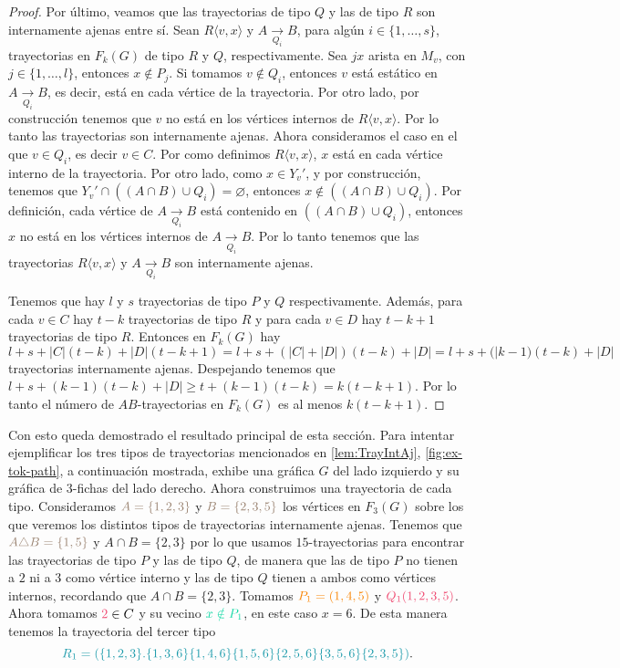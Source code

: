 \begin{proof}
    Por \'ultimo, veamos que las trayectorias de tipo $Q$ y las de tipo $R$ son
    internamente ajenas entre s\'i. Sean $R\langle v,x \rangle$ y $A
    \xrightarrow[Q_i]{}  B$, para alg\'un $i \in \{1, \dots, s\}$, trayectorias
    en $F_k(G)$ de tipo $R$ y $Q$, respectivamente. Sea $jx$ arista en $M_v$,
    con $j \in \{1, \dots, l\}$, entonces $x \notin P_j$. Si tomamos $v \notin
    Q_i$, entonces $v$ est\'a est\'atico en $A \xrightarrow[Q_i]{} B$, es decir,
    est\'a en cada v\'ertice de la trayectoria. Por otro lado, por
    construcci\'on tenemos que $v$ no est\'a en los v\'ertices internos de $R
    \langle v, x \rangle$. Por lo tanto las trayectorias son internamente
    ajenas. Ahora consideramos el caso en el que $v \in Q_i$, es decir $v \in
    C$. Por como definimos $R \langle v,x \rangle$, $x$ est\'a en cada
    v\'ertice interno de la trayectoria. Por otro lado, como $x \in Y_v'$, y por
    construcci\'on, tenemos que $Y_v ' \cap ((A\cap B) \cup Q_i) = \varnothing$,
    entonces $x \notin ((A \cap B) \cup Q_i)$. Por definici\'on, cada v\'ertice
    de $A \xrightarrow[Q_i]{}  B$ est\'a contenido en $((A \cap B) \cup Q_i)$,
    entonces $x$ no est\'a en los v\'ertices internos de $A \xrightarrow[Q_i]{}
    B$. Por lo tanto tenemos que las trayectorias $R \langle v,x \rangle$ y $A
    \xrightarrow[Q_i]{}  B$ son internamente ajenas.

    Tenemos que hay $l$ y $s$ trayectorias de tipo $P$ y $Q$ respectivamente.
    Adem\'as, para cada $v \in C$ hay $t-k$ trayectorias de tipo $R$ y para cada
    $v \in D$ hay $t-k+1$ trayectorias de tipo $R$. Entonces en $F_k(G)$ hay $l+
    s+ |C|(t-k)+ |D|(t-k +1) = l + s + (|C| + |D|)(t-k) + |D| = l + s +
    (|k-1)(t-k) + |D|$ trayectorias internamente ajenas. Despejando tenemos que
    $l + s + (k-1)(t-k) + |D| \geq t+ (k-1)(t-k) = k (t -k +1)$. Por lo tanto el
    n\'umero de $AB$-trayectorias en $F_k(G)$ es al menos $k(t-k+1)$.

\end{proof}

Con esto queda demostrado el resultado principal de esta secci\'on. Para
intentar ejemplificar los tres tipos de trayectorias mencionados en
\cref{lem:TrayIntAj}, \cref{fig:ex-tok-path}, a continuaci\'on mostrada, exhibe
una gr\'afica $G$ del lado izquierdo y su gr\'afica de $3$-fichas del lado
derecho. Ahora construimos una trayectoria de cada tipo. Consideramos
${\color{baige}A= \{1,2,3\}}$ y ${\color{baige}B=\{2,3,5\}}$ los v\'ertices en
$F_3(G)$ sobre los que veremos los distintos tipos de trayectorias internamente
ajenas. Tenemos que ${\color{baige}A\triangle B=\{1,5\}}$ y $A\cap B=\{2,3\}$
por lo que usamos $15$-trayectorias para encontrar las trayectorias de tipo $P$
y las de tipo $Q$, de manera que las de tipo $P$ no tienen a $2$ ni a $3$ como
v\'ertice interno y las de tipo $Q$ tienen a ambos como v\'ertices internos,
recordando que $A\cap B=\{2,3\}$. Tomamos ${\color{naranja}P_1=(1,4,5)}$ y
${\color{fushia}Q_1(1,2,3,5)}$. Ahora tomamos ${\color{fushia}2} \in C$ y su
vecino ${\color{menta}x\notin P_1}$, en este caso $x=6$. De esta manera tenemos
la trayectoria del tercer tipo
\[
    {\color{verdeAzulado}R_1=(\{1,2,3\}.\{1,3,6\}\{1,4,6\}\{1,5,6\}\{2,5,6\}
    \{3,5,6\}\{2,3,5\})}.
\]


